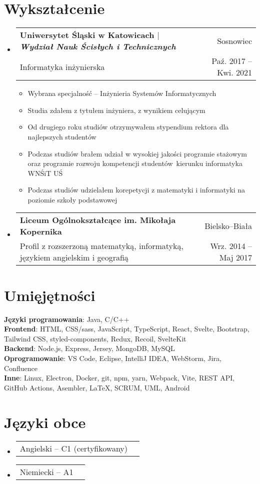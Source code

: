 \documentclass[A4,11pt]{article}
\makeatletter
\newcommand{\CVItem}[1]{\item\small{\setstretch{0.8}#1}}
\newcommand{\CVSubheading}[4]{
  \item
    \begin{tabular*}{0.97\textwidth}[t]{l@{\extracolsep{\fill}}r}
      \textbf{\setstretch{0.4}#1} & #2 \\
      \small#3 & \small #4 \\
    \end{tabular*}\vspace{3pt}
}
\newcommand{\CVSubSubheading}[2]{
  \item
    \begin{tabular*}{0.97\textwidth}{l@{\extracolsep{\fill}}r}
      \small#1 & \small #2 \\
    \end{tabular*}\vspace{-4pt}
}
\newcommand{\CVSubHeadingListStart}{\begin{itemize}[leftmargin=0.5cm, label={}]}
\newcommand{\CVSubHeadingListEnd}{\end{itemize}}
\newcommand{\CVItemListStart}{\begin{itemize}\vspace{-8pt}}
\newcommand{\CVItemListEnd}{\end{itemize}\vspace{-1pt}}
\makeatother
\begin{document}
\section{Wykształcenie}
  \CVSubHeadingListStart
    \CVSubheading
      {Uniwersytet Śląski w Katowicach $|$ \emph{\small{Wydział Nauk Ścisłych i Technicznych}}}{Sosnowiec}
      {Informatyka inżynierska}{Paź. 2017 -- Kwi. 2021}
      \CVItemListStart
        \CVItem{Wybrana specjalność -- Inżynieria Systemów Informatycznych}
        \CVItem{Studia zdałem z tytułem inżyniera, z wynikiem celującym}
        \CVItem{Od drugiego roku studiów otrzymywałem stypendium rektora dla najlepszych studentów}
        \CVItem{Podczas studiów brałem udział w wysokiej jakości programie stażowym oraz programie rozwoju kompetencji studentów~kierunku informatyka WNŚiT UŚ}
        \CVItem{Podczas studiów udzielałem korepetycji z matematyki i informatyki na poziomie szkoły podstawowej}
      \CVItemListEnd
    \CVSubheading
      {Liceum Ogólnokształcące im. Mikołaja Kopernika}{Bielsko--Biała}
      {Profil z rozszerzoną matematyką, informatyką, językiem angielskim i geografią}{Wrz. 2014 -- Maj 2017}
  \CVSubHeadingListEnd


\section{Umięjętności}
  \begin{itemize}[leftmargin=0.5cm, label={}]
    \small{\item{
    \textbf{Języki programowania}{: Java, C/C++} \\
    \textbf{Frontend}{: HTML, CSS/sass, JavaScript, TypeScript, React, Svelte, Bootstrap, Tailwind CSS, styled-components,  Redux, Recoil, SvelteKit} \\
    \textbf{Backend}{: Node.js, Express, Jersey, MongoDB, MySQL} \\
    \textbf{Oprogramowanie}{: VS Code, Eclipse, IntelliJ IDEA, WebStorm, Jira, Confluence} \\
    \textbf{Inne}{: Linux, Electron, Docker, git, npm, yarn, Webpack, Vite, REST API, GitHub Actions, Asembler, \LaTeX, SCRUM, UML, Android}
    }}
  \end{itemize}

\section{Języki obce}
  \CVSubHeadingListStart
    \CVSubSubheading{Angielski -- C1 (certyfikowany)}{}
    \CVSubSubheading{Niemiecki -- A1}{}
  \CVSubHeadingListEnd
\end{document}
